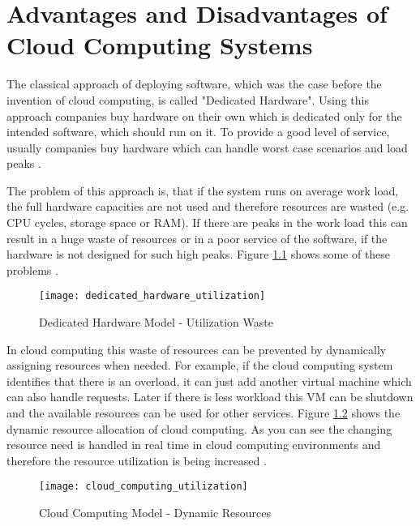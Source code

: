 \chapter{Advantages and Disadvantages of Cloud Computing Systems}
\label{chap:advantages}

The classical approach of deploying software, which was the case before the invention of cloud computing, is called "Dedicated Hardware". Using this approach companies buy hardware on their own which is dedicated only for the intended software, which should run on it. To provide a good level of service, usually companies buy hardware which can handle worst case scenarios and load peaks \cite{Gajbhiye_2014}.

The problem of this approach is, that if the system runs on average work load, the full hardware capacities are not used and therefore resources are wasted (e.g. CPU cycles, storage space or RAM). If there are peaks in the work load this can result in a huge waste of resources or in a poor service of the software, if the hardware is not designed for such high peaks. Figure \ref{fig:dedicated_hardware_utilization} shows some of these problems \cite{Gajbhiye_2014}.

\begin{figure}
	\centering
		\texttt{[image: dedicated\_hardware\_utilization]}
	\caption{Dedicated Hardware Model - Utilization Waste \cite{Gajbhiye_2014}}
	\label{fig:dedicated_hardware_utilization}
\end{figure}

In cloud computing this waste of resources can be prevented by dynamically assigning resources when needed. For example, if the cloud computing system identifies that there is an overload, it can just add another virtual machine which can also handle requests. Later if there is less workload this VM can be shutdown and the available resources can be used for other services. Figure \ref{fig:cloud_computing_utilization} shows the dynamic resource allocation of cloud computing. As you can see the changing resource need is handled in real time in cloud computing environments and therefore the resource utilization is being increased \cite{Gajbhiye_2014}.

\begin{figure}
	\centering
		\texttt{[image: cloud\_computing\_utilization]}
	\caption{Cloud Computing Model - Dynamic Resources \cite{Gajbhiye_2014}}
	\label{fig:cloud_computing_utilization}
\end{figure}

